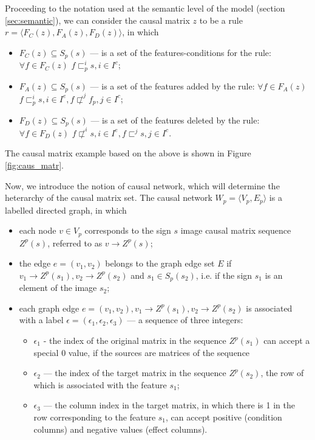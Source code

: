 \documentclass[review]{elsarticle}
\begin{document}
Proceeding to the notation used at the semantic level of the model (section \ref{sec:semantic}), we can consider the causal matrix $z$ to be a rule $r=\langle F_C(z),F_A(z),F_D(z)\rangle$, in which
\begin{itemize}
	\item $F_C (z)\subseteq S_p(s)$ --- is a set of the features-conditions for the rule: $\forall f\in F_C(z)$ $f\sqsubset_p^i s, i\in I^c$;
	
	\item $F_A(z)\subseteq S_p(s)$ --- is a set of the features added by the rule: $\forall f\in F_A(z)$ $f\sqsubset_p^i s,i\in I^e, f\not\sqsubset^j f_p, j\in I^c$;
	
	\item $F_D(z)\subseteq S_p(s)$ --- is a set of the features deleted by the rule: $\forall f\in F_D(z)$ $f\not\sqsubset^i s, i\in I^e,f\sqsubset^j s, j\in I^c$.
\end{itemize}

The causal matrix example based on the above is shown in Figure \ref{fig:caus_matr}.

Now, we introduce the notion of causal network, which will determine the heterarchy of the causal matrix set. The causal network $W_p=\langle V_p, E_p \rangle$ is a labelled directed graph, in which
\begin{itemize}
	\item each node $v\in V_p$ corresponds to the sign $s$ image causal matrix sequence $Z^p(s)$, referred to as $v\rightarrow Z^p(s)$;
	\item the edge $e=(v_1, v_2)$ belongs to the graph edge set $E$ if $v_1\rightarrow Z^p(s_1), v_2\rightarrow Z^p(s_2)$ and $s_1\in S_p(s_2)$, i.e. if the sign $s_1$ is an element of the image $s_2$;
	\item each graph edge $e=(v_1, v_2), v_1\rightarrow Z^p(s_1), v_2\rightarrow Z^p(s_2)$ is associated with a label $\epsilon=(\epsilon_1,\epsilon_2,\epsilon_3)$ --- a sequence of three integers:
	\begin{itemize}
		\item $\epsilon_1$ - the index of the original matrix in the sequence $Z^p(s_1)$ can accept a special 0 value, if the sources are matrices of the sequence
		\item $\epsilon_2$ --- the index of the target matrix in the sequence $Z^p(s_2)$, the row of which is associated with the feature $s_1$;
		\item $\epsilon_3$ --- the column index in the target matrix, in which there is 1 in the row corresponding to the feature $s_1$, can accept positive (condition columns) and negative values (effect columns).
	\end{itemize}		
\end{itemize}
\end{document}
